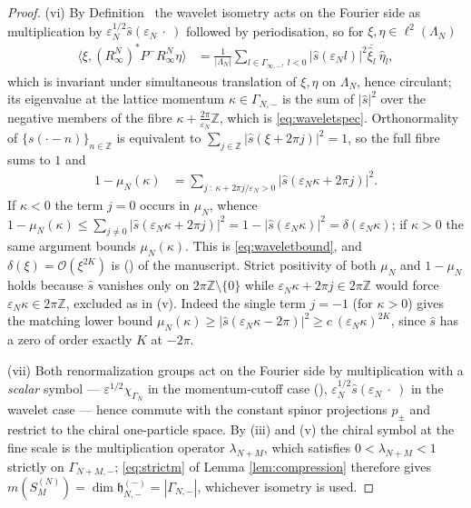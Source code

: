 \documentclass[11pt,a4paper]{article}
\theoremstyle{definition}
\newcommand{\fh}{\mathfrak{h}}
\newcommand{\vep}{\varepsilon}
\newcommand{\1}{\mathds{1}}
\newcommand{\ltwo}{\ell^{2}}
\newcommand{\Z}{\mathbb{Z}}
\newcommand{\Gam}{\Gamma}
\begin{document}
\begin{proof}
(vi) By Definition \mrDefWavRG\ the wavelet isometry acts on the Fourier side as multiplication by
$\vep_{N}^{1/2}\hat{s}(\vep_{N}\!\ \cdot\!\ )$ followed by periodisation, so for
$\xi,\eta\in\ltwo(\Lambda_{N})$
\begin{align*}
\big\langle\xi,(R^{N}_{\infty})^{*}P^{-}R^{N}_{\infty}\eta\big\rangle
 & = \frac{1}{|\Lambda_{N}|}\sum_{l\in\Gam_{\infty,-},\!\ l<0}\big|\hat{s}(\vep_{N}l)\big|^{2}
 \overline{\hat{\xi}_{l}}\!\ \hat{\eta}_{l},
\end{align*}
which is invariant under simultaneous translation of $\xi,\eta$ on $\Lambda_{N}$, hence circulant;
its eigenvalue at the lattice momentum $\kappa\in\Gam_{N,-}$ is the sum of $|\hat{s}|^{2}$ over the
negative members of the fibre $\kappa+\tfrac{2\pi}{\vep_{N}}\Z$, which is \eqref{eq:waveletspec}.
Orthonormality of $\{s(\cdot-n)\}_{n\in\Z}$ is equivalent to $\sum_{j\in\Z}|\hat{s}(\xi+2\pi j)|^{2}
=1$, so the full fibre sums to $1$ and
\begin{align*}
1-\mu_{N}(\kappa) & = \!\!\!\sum_{j\!\ :\!\ \kappa+2\pi j/\vep_{N}>0}\!\!\!
 \big|\hat{s}(\vep_{N}\kappa+2\pi j)\big|^{2}.
\end{align*}
If $\kappa<0$ the term $j=0$ occurs in $\mu_{N}$, whence $1-\mu_{N}(\kappa)\leq\sum_{j\neq0}
|\hat{s}(\vep_{N}\kappa+2\pi j)|^{2}=1-|\hat{s}(\vep_{N}\kappa)|^{2}=\delta(\vep_{N}\kappa)$; if
$\kappa>0$ the same argument bounds $\mu_{N}(\kappa)$. This is \eqref{eq:waveletbound}, and
$\delta(\xi)=\mathcal{O}(\xi^{2K})$ is (\mrAlias) of the manuscript. Strict positivity of both
$\mu_{N}$ and $1-\mu_{N}$ holds because $\hat{s}$ vanishes only on $2\pi\Z\setminus\{0\}$ while
$\vep_{N}\kappa+2\pi j\in2\pi\Z$ would force $\vep_{N}\kappa\in2\pi\Z$, excluded as in (v). Indeed
the single term $j=-1$ (for $\kappa>0$) gives the matching lower bound
$\mu_{N}(\kappa)\geq|\hat{s}(\vep_{N}\kappa-2\pi)|^{2}\geq c\!\ (\vep_{N}\kappa)^{2K}$, since
$\hat{s}$ has a zero of order exactly $K$ at $-2\pi$.

(vii) Both renormalization groups act on the Fourier side by multiplication with a \emph{scalar} symbol --- $\vep^{1/2}\chi_{\Gam_{N}}$ in the momentum-cutoff case (\mrMomRG), $\vep_{N}^{1/2}\hat{s}(\vep_{N}\!\ \cdot\!\ )$ in the wavelet case --- hence commute with the constant spinor projections $p_{\pm}$ and restrict to the chiral one-particle space. By (iii) and (v) the chiral symbol at the fine scale is the multiplication operator $\lambda_{N+M}$, which satisfies $0<\lambda_{N+M}<1$ strictly on $\Gam_{N+M,-}$; \eqref{eq:strictm} of Lemma \ref{lem:compression} therefore gives $m(S^{(N)}_{M})=\dim\fh^{(-)}_{N,-}=|\Gam_{N,-}|$, whichever isometry is used.
\end{proof}
\end{document}
